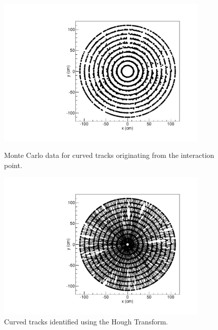 \documentclass{JINST}
\begin{document}
\begin{figure}[!Hhtb]
\begin{minipage}[t]{8.0cm}
\begin{center}
	\includegraphics[width=0.9\textwidth]{figs/curved_500events_hits.pdf}
	\caption{Monte Carlo data for curved tracks originating from the interaction point. \label{fig:mc_hits}}
	\end{center}
\end{minipage}
\begin{minipage}[t]{8.0cm}
\begin{center}
	\includegraphics[width=0.9\textwidth]{figs/curved_500events_hits_tracks.pdf}
	\caption{Curved tracks identified using the Hough Transform.  \label{fig:mc_tracks}}
	\end{center}
\end{minipage}
\end{figure}
\end{document}

